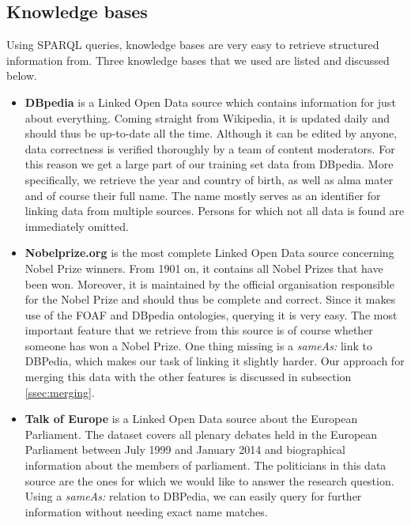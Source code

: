 \subsection{Knowledge bases}
\label{ssec:knowledgebases}

Using SPARQL queries, knowledge bases are very easy to retrieve structured information from. Three knowledge bases that we used are listed and discussed below.

\begin{itemize}
\item{\textbf{DBpedia}} is a Linked Open Data source which contains information for just about everything. Coming straight from Wikipedia, it is updated daily and should thus be up-to-date all the time. Although it can be edited by anyone, data correctness is verified thoroughly by a team of content moderators. For this reason we get a large part of our training set data from DBpedia. More specifically, we retrieve the year and country of birth, as well as alma mater and of course their full name. The name mostly serves as an identifier for linking data from multiple sources. Persons for which not all data is found are immediately omitted.

\item{\textbf{Nobelprize.org}} is the most complete Linked Open Data source concerning Nobel Prize winners. From 1901 on, it contains all Nobel Prizes that have been won. Moreover, it is maintained by the official organisation responsible for the Nobel Prize and should thus be complete and correct. Since it makes use of the FOAF and DBpedia ontologies, querying it is very easy. The most important feature that we retrieve from this source is of course whether someone has won a Nobel Prize. One thing missing is a \emph{sameAs:} link to DBPedia, which makes our task of linking it slightly harder. Our approach for merging this data with the other features is discussed in subsection \ref{ssec:merging}.

\item{\textbf{Talk of Europe}} is a Linked Open Data source about the European Parliament. The dataset covers all plenary debates held in the European Parliament between July 1999 and January 2014 and biographical information about the members of parliament. The politicians in this data source are the ones for which we would like to answer the research question. Using a \emph{sameAs:} relation to DBPedia, we can easily query for further information without needing exact name matches.
\end{itemize}

